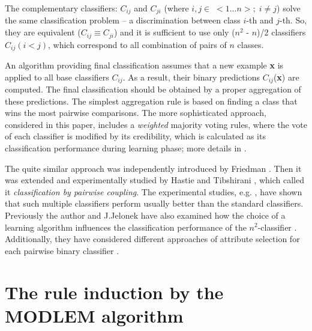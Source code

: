 \documentclass{llncs}
\begin{document}
The complementary classifiers: $C_{ij}$ and $C_{ji}$ (where $i,j \in \;  <1
\ldots n>; \; i \neq j$) solve the same classification problem -- a
discrimination between class $i$-th and $j$-th. So, they are equivalent
($C_{ij} \equiv C_{ji}$) and it is sufficient to use only ($n^2$ - $n$)/2
classifiers $C_{ij} (i < j)$, which correspond to all combination of pairs
of $n$ classes.


An algorithm providing final classification assumes that a new example {\bf
x} is applied to all base classifiers $C_{ij}$. As a result, their binary
predictions $C_{ij}$({\bf x}) are computed. The final classification should
be obtained by a proper aggregation of these predictions. The simplest
aggregation rule is based on finding a class that wins the most pairwise
comparisons. The more sophisticated approach, considered in this paper,
includes a \emph{weighted} majority voting rules, where the vote of each
classifier is modified by its credibility, which is calculated as its
classification performance during learning phase; more details in
\cite{JelStef98}.

The quite similar approach was independently introduced by
Friedman \cite {Friedman}. Then it was extended and experimentally
studied by Hastie and Tibshirani \cite{Hastie}, which called it
{\em classification by pairwise coupling}. The experimental
studies, e.g. \cite{Friedman,Hastie,JelStef98}, have shown that
such multiple classifiers perform usually better than the standard
classifiers. Previously the author and J.Jelonek have also
examined how the choice of a learning algorithm influences the
classification performance of the $n^2$-classifier
\cite{JelStef98}. Additionally, they have considered different
approaches of attribute selection for each pairwise binary
classifier \cite{JelStef01}.


\section{The rule induction by the MODLEM algorithm}
\end{document}
